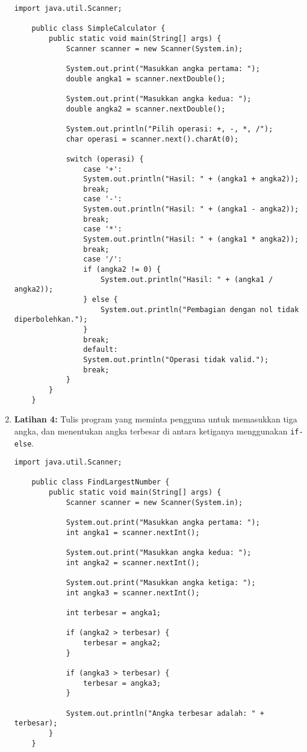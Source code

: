 \begin{enumerate}
\begin{lstlisting}[style=JavaStyle]
	import java.util.Scanner;
	
	public class SimpleCalculator {
		public static void main(String[] args) {
			Scanner scanner = new Scanner(System.in);
			
			System.out.print("Masukkan angka pertama: ");
			double angka1 = scanner.nextDouble();
			
			System.out.print("Masukkan angka kedua: ");
			double angka2 = scanner.nextDouble();
			
			System.out.println("Pilih operasi: +, -, *, /");
			char operasi = scanner.next().charAt(0);
			
			switch (operasi) {
				case '+':
				System.out.println("Hasil: " + (angka1 + angka2));
				break;
				case '-':
				System.out.println("Hasil: " + (angka1 - angka2));
				break;
				case '*':
				System.out.println("Hasil: " + (angka1 * angka2));
				break;
				case '/':
				if (angka2 != 0) {
					System.out.println("Hasil: " + (angka1 / angka2));
				} else {
					System.out.println("Pembagian dengan nol tidak diperbolehkan.");
				}
				break;
				default:
				System.out.println("Operasi tidak valid.");
				break;
			}
		}
	}
\end{lstlisting}
	
\item \textbf{Latihan 4:} Tulis program yang meminta pengguna untuk memasukkan tiga angka, dan menentukan angka terbesar di antara ketiganya menggunakan \texttt{if-else}.

\begin{lstlisting}[style=JavaStyle]
	import java.util.Scanner;
	
	public class FindLargestNumber {
		public static void main(String[] args) {
			Scanner scanner = new Scanner(System.in);
			
			System.out.print("Masukkan angka pertama: ");
			int angka1 = scanner.nextInt();
			
			System.out.print("Masukkan angka kedua: ");
			int angka2 = scanner.nextInt();
			
			System.out.print("Masukkan angka ketiga: ");
			int angka3 = scanner.nextInt();
			
			int terbesar = angka1;
			
			if (angka2 > terbesar) {
				terbesar = angka2;
			}
			
			if (angka3 > terbesar) {
				terbesar = angka3;
			}
			
			System.out.println("Angka terbesar adalah: " + terbesar);
		}
	}
\end{lstlisting}


\end{enumerate}
